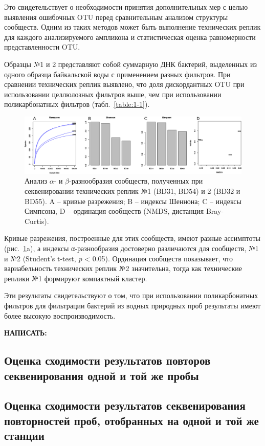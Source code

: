 \documentclass[a4paper,12pt,openany,final]{extreport}
\def\oldcaption{} \let\oldcaption=\caption
\def\caption{\stepcounter{captionsnum}\oldcaption}
\begin{document}
Это свидетельствует о необходимости принятия дополнительных мер с целью
выявления ошибочных OTU перед сравнительным анализом структуры
сообществ. Одним из таких методов может быть выполнение технических
реплик для каждого анализируемого ампликона и статистическая оценка
равномерности представленности OTU.

Образцы №1 и 2 представляют собой суммарную ДНК бактерий, выделенных из
одного образца байкальской воды с применением разных фильтров. При
сравнении технических реплик выявлено, что доля дискордантных OTU при
использовании целлюлозных фильтров выше, чем при использовании
поликарбонатных фильтров (табл.~\ref{table:1-1}).

\begin{figure}\centering
  \includegraphics[width=0.9\linewidth]{media/image6.png}
  \caption{Анализ \(\alpha\)- и \(\beta\)-разнообразия сообществ, полученных при секвенировании
технических реплик №1 (BD31, BD54) и 2 (BD32 и BD55). A -- кривые
разрежения; B -- индексы Шеннона; C -- индексы Симпсона, D -- ординация
сообществ (NMDS, дистанция Bray-Curtis).}\label{fig:2}
\end{figure}


Кривые разрежения, построенные для этих сообществ, имеют разные
ассимптоты (рис.~\ref{fig:2}a), а индексы α-разнообразия достоверно различаются
для сообществ, №1 и №2 (Student's t-test, \emph{p} \textless{} 0.05).
Ординация сообществ показывает, что вариабельность технических реплик №2
значительна, тогда как технические реплики №1 формируют компактный
кластер.

Эти результаты свидетельствуют о том, что при использовании
поликарбонатных фильтров для фильтрации бактерий из водных природных
проб результаты имеют более высокую воспроизводимость.

\textbf{НАПИСАТЬ:}

\subsection{Оценка сходимости результатов повторов секвенирования
одной и той же пробы }

\subsection{Оценка сходимости результатов секвенирования повторностей
проб, отобранных на одной и той же станции}
\end{document}
